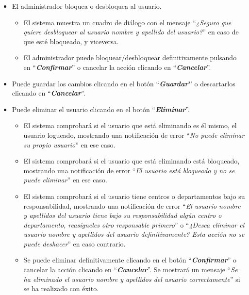 \begin{enumerate}
\begin{itemize}
                \item El administrador bloquea o desbloquea al usuario.
                    \begin{itemize}
                    \tightlist
                        \item El sistema muestra un cuadro de diálogo con el mensaje ``\textit{¿Seguro que quiere desbloquear al usuario nombre y apellido del usuario?}'' en caso de que esté bloqueado, y viceversa.
                        
                        \item El administrador puede bloquear/desbloquear definitivamente pulsando en ``\textbf{\textit{Confirmar}}'' o cancelar la acción clicando en  ``\textbf{\textit{Cancelar}}''.
                    \end{itemize}
                
                
                \item Puede guardar los cambios clicando en el botón ``\textbf{\textit{Guardar}'}' o descartarlos clicando en  ``\textbf{\textit{Cancelar}}''. 
                
                \item Puede eliminar el usuario clicando en el botón  ``\textbf{\textit{Eliminar}}''.
                    \begin{itemize}
                    \tightlist
                        \item El sistema comprobará si el usuario que está eliminando es él mismo, el usuario logueado, mostrando una notificación de error ``\textit{No puede eliminar su propio usuario}'' en ese caso.
                        
                        \item El sistema comprobará si el usuario que está eliminando está bloqueado, mostrando una notificación de error ``\textit{El usuario está bloqueado y no se puede eliminar}'' en ese caso.
                        
                        \item El sistema comprobará si el usuario tiene centros o departamentos bajo su responsabilidad, mostrando una notificación de error ``\textit{El usuario nombre y apellidos del usuario tiene bajo su responsabilidad algún centro o departamento, reasígneles otro responsable primero}'' o ``\textit{¿Desea eliminar el usuario nombre y apellidos del usuario definitivamente? Esta acción no se puede deshacer}'' en caso contrario.
                        
                        \item Se puede eliminar definitivamente clicando en el botón  ``\textbf{\textit{Confirmar}}'' o cancelar la acción clicando en  ``\textbf{\textit{Cancelar}}''. Se mostrará un mensaje ``\textit{Se ha eliminado el usuario nombre y apellidos del usuario correctamente}'' si se ha realizado con éxito.
                    \end{itemize}
            \end{itemize}
    \end{enumerate}

